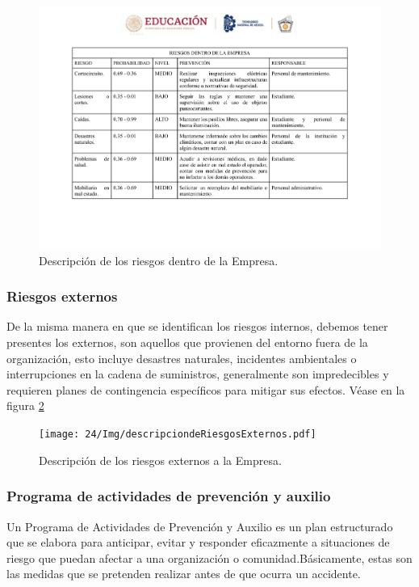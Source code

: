     \begin{figure}
        \centering
    \includegraphics[trim = {0mm 30mm 0mm 0mm},clip,scale=0.3]{24/Img/descripciondeRiesgos.pdf}
        \caption{Descripción de los riesgos dentro de la Empresa.}
        \label{Descripcion de riesgos}
    \end{figure}
    \subsubsection{Riesgos externos}
    De la misma manera en que se identifican los riesgos internos, debemos tener presentes los externos, son aquellos que provienen del entorno fuera de la organización, esto incluye desastres naturales, incidentes ambientales o interrupciones en la cadena de suministros, generalmente son impredecibles y requieren planes de contingencia específicos para mitigar sus efectos. Véase en la figura \ref{Descripcion de riesgos externos} 
    \begin{figure}
        \centering
    \texttt{[image: 24/Img/descripciondeRiesgosExternos.pdf]}
        \caption{Descripción de los riesgos externos a la Empresa.}
        \label{Descripcion de riesgos externos}
    \end{figure}
    \subsubsection{Programa de actividades de prevención y auxilio}
    Un Programa de Actividades de Prevención y Auxilio es un plan estructurado que se elabora para anticipar, evitar y responder eficazmente a situaciones de riesgo que puedan afectar a una organización o comunidad.Básicamente, estas son las medidas que se pretenden realizar antes de que ocurra un accidente.
